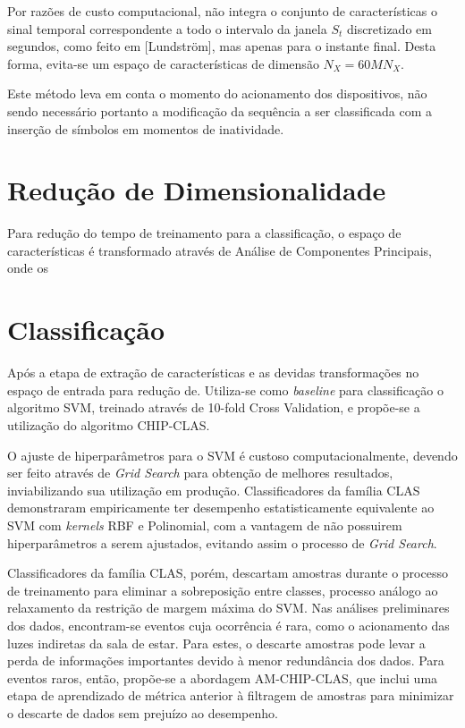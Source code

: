 \documentclass[
	12pt,				%
	openright,			%
	twoside,			%
	a4paper,			%
	english,			%
	spanish,			%
	brazil,				%
	]{abntex2}\usepackage[]{graphicx}\usepackage[]{color}
\begin{document}
Por razões de custo computacional, não integra o conjunto de características o sinal temporal correspondente a todo o intervalo da janela $S_t$ discretizado em segundos, como feito em [Lundström], mas apenas para o instante final. Desta forma, evita-se um espaço de características de dimensão $N_X = 60 M N_X$.

Este método leva em conta o momento do acionamento dos dispositivos, não sendo necessário portanto a modificação da sequência a ser classificada com a inserção de símbolos em momentos de inatividade.

\section{Redução de Dimensionalidade}

Para redução do tempo de treinamento para a classificação, o espaço de características é transformado através de Análise de Componentes Principais, onde os

\section{Classificação}

Após a etapa de extração de características e as devidas transformações no espaço de entrada para redução de. Utiliza-se como \textit{baseline} para classificação o algoritmo SVM, treinado através de 10-fold Cross Validation, e propõe-se a utilização do algoritmo CHIP-CLAS.

O ajuste de hiperparâmetros para o SVM é custoso computacionalmente, devendo ser feito através de \textit{Grid Search} para obtenção de melhores resultados, inviabilizando sua utilização em produção. Classificadores da família CLAS demonstraram empiricamente ter desempenho estatisticamente equivalente ao SVM com \textit{kernels} RBF e Polinomial, com a vantagem de não possuirem hiperparâmetros a serem ajustados, evitando assim o processo de \textit{Grid Search}.

Classificadores da família CLAS, porém, descartam amostras durante o processo de treinamento para eliminar a sobreposição entre classes, processo análogo ao relaxamento da restrição de margem máxima do SVM. Nas análises preliminares dos dados, encontram-se eventos cuja ocorrência é rara, como o acionamento das luzes indiretas da sala de estar. Para estes, o descarte amostras pode levar a perda de informações importantes devido à menor redundância dos dados. Para eventos raros, então, propõe-se a abordagem AM-CHIP-CLAS, que inclui uma etapa de aprendizado de métrica anterior à filtragem de amostras para minimizar o descarte de dados sem prejuízo ao desempenho.
\end{document}
